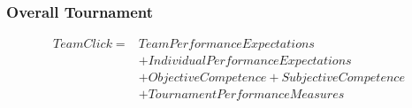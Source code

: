  \subsubsection{Overall Tournament}

     \begin{align*}
       Team Click =  & Team Performance Expectations  \\
                 &+ Individual Performance Expectations   \\
                 &+ Objective Competence + Subjective Competence \\
                 &+ TournamentPerformanceMeasures  \\
     \end{align*}



   




